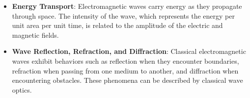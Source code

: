 \documentclass{article}
\theoremstyle{definition}
\begin{document}
\begin{itemize}
\item {\bf Energy Transport}: Electromagnetic waves carry energy
as they propagate through space. The intensity of the wave, which
represents the energy per unit area per unit time, is related to
the amplitude of the electric and magnetic fields.

\item {\bf Wave Reflection, Refraction, and Diffraction}:
Classical electromagnetic waves exhibit behaviors such as
reflection when they encounter boundaries, refraction when
passing from one medium to another, and diffraction when
encountering obstacles. These phenomena can be described by
classical wave optics.
\end{itemize}
%
%
\bigskip
\begin{figure}[H]                                                               %
    \centering                                                                  %
\end{figure}
\end{document}
